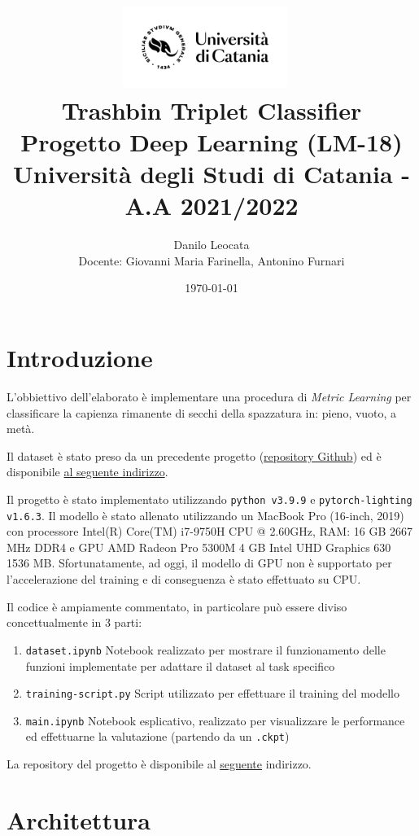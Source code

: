 \documentclass[11pt]{article}
\title{ %
\includegraphics[width=0.4\textwidth]{UniCT-Logo-Nero}~\\
Trashbin Triplet Classifier \\ 
\large Progetto Deep Learning (LM-18) \\ Università degli Studi di Catania - A.A 2021/2022 \\
}
\author{ Danilo Leocata \\ Docente: Giovanni Maria Farinella, Antonino Furnari}
\date{\today}
\begin{document}
\maketitle	
\pagebreak


\section{Introduzione}

L'obbiettivo dell'elaborato è implementare una procedura di \textit{Metric Learning} per classificare la 
capienza rimanente di secchi della spazzatura in: pieno, vuoto, a metà.

Il dataset è stato preso da un precedente progetto (\href{https://github.com/khalld/trashbin-classifier}{repository Github}) ed è disponibile \href{https://drive.google.com/drive/folders/11SGtZrM8BWJDPOcnKR7RjLJs0dJOfSCA?usp=sharing}{al seguente indirizzo}.

Il progetto è stato implementato utilizzando \texttt{python v3.9.9} e \texttt{pytorch-lighting v1.6.3}. Il modello è stato allenato utilizzando un MacBook Pro (16-inch, 2019) con processore Intel(R) Core(TM) i7-9750H CPU @ 2.60GHz, RAM: 16 GB 2667 MHz DDR4 e GPU AMD Radeon Pro 5300M 4 GB
Intel UHD Graphics 630 1536 MB. Sfortunatamente, ad oggi, il modello di GPU non è supportato per l'accelerazione del training e di conseguenza è stato effettuato su CPU.

Il codice è ampiamente commentato, in particolare può essere diviso concettualmente in 3 parti:

\begin{enumerate}
    \item \texttt{dataset.ipynb} Notebook realizzato per mostrare il funzionamento delle funzioni implementate per adattare il dataset al task specifico
    \item \texttt{training-script.py} Script utilizzato per effettuare il training del modello
    \item \texttt{main.ipynb} Notebook esplicativo, realizzato per visualizzare le performance ed effettuarne la valutazione (partendo da un \texttt{.ckpt})
\end{enumerate}

La repository del progetto è disponibile al \href{https://github.com/khalld/triplet-trashbin-classifier}{seguente} indirizzo.

\pagebreak

\section{Architettura}
\end{document}
